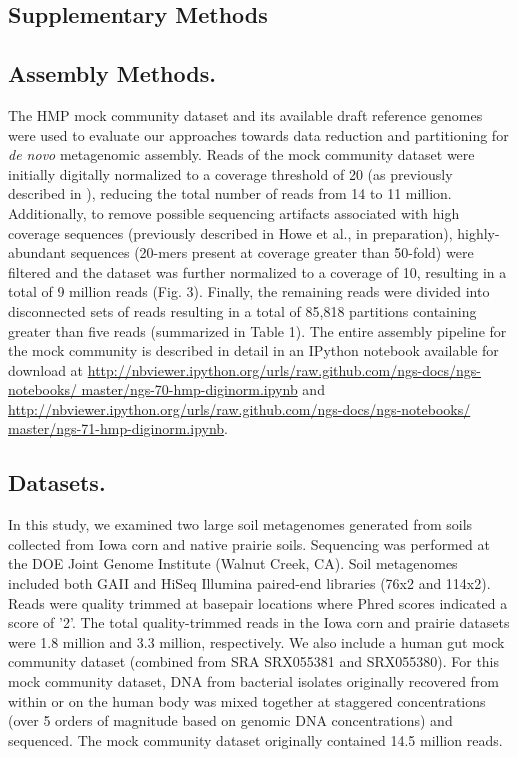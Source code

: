 \documentclass{pnastwo}
\begin{document}
\begin{article}
\section*{Supplementary Methods}
\subsection*{Assembly Methods.} The HMP mock community dataset and its available draft reference
genomes were used to evaluate our approaches towards data reduction
and partitioning for \emph{de novo} metagenomic assembly.  Reads of
the mock community dataset were initially digitally normalized to a
coverage threshold of 20 (as previously described in \cite{browndiginorm}),
reducing the total number of reads from 14 to 11 million.
Additionally, to remove possible sequencing artifacts associated with
high coverage sequences (previously described in Howe et al., in preparation),
highly-abundant sequences (20-mers present at coverage greater than
50-fold) were filtered and the dataset was further normalized to a
coverage of 10, resulting in a total of 9 million reads (Fig.
3).  Finally, the remaining reads were divided into
disconnected sets of reads resulting in a total of 85,818 partitions
containing greater than five reads (summarized in
Table 1).  The entire assembly pipeline for the mock community is described in
detail in an IPython notebook available for download at 
\url{http://nbviewer.ipython.org/urls/raw.github.com/ngs-docs/ngs-notebooks/
master/ngs-70-hmp-diginorm.ipynb}
and 
\url{http://nbviewer.ipython.org/urls/raw.github.com/ngs-docs/ngs-notebooks/
master/ngs-71-hmp-diginorm.ipynb}. 

\subsection*{Datasets.}
In this study, we examined two large soil metagenomes generated from
soils collected from Iowa corn and native prairie soils.  Sequencing
was performed at the DOE Joint Genome Institute (Walnut Creek, CA).  Soil metagenomes included both
GAII and HiSeq Illumina paired-end libraries (76x2 and 114x2).  
Reads were quality trimmed at basepair locations where Phred scores indicated a score of
'2'.  The total quality-trimmed reads in the Iowa corn and prairie
datasets were 1.8 million and 3.3 million, respectively.  We also
include a human gut mock community dataset (combined from SRA
SRX055381 and SRX055380).  For this mock community dataset, DNA from
bacterial isolates originally recovered from within or on the human
body was mixed together at staggered concentrations (over 5 orders of
magnitude based on genomic DNA concentrations) and sequenced.  The
mock community dataset originally contained 14.5 million reads.


\end{article}
\end{document}
